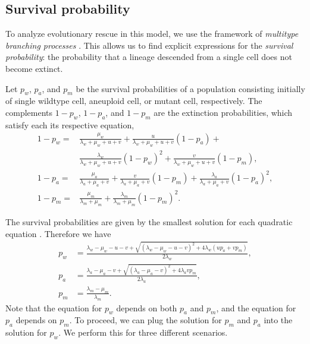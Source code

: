 \documentclass[12pt]{extarticle}
\begin{document}

\subsection*{Survival probability}

To analyze evolutionary rescue in this model, we use the framework of \emph{multitype branching processes} \citep{rybnikov2021fitness,harris1963theory}. 
This allows us to find explicit expressions for the \emph{survival probability}: the probability that a lineage descended from a single cell does not become extinct.

Let $p_w$, $p_a$, and $p_m$ be the survival probabilities of a population consisting initially of single wildtype cell, aneuploid cell, or mutant cell, respectively.
The complements $1-p_w$, $1-p_a$, and $1-p_m$ are the extinction probabilities, which satisfy each its respective equation,
\begin{equation} \label{extinction_prob}
\begin{aligned}
1-p_w = &\frac{\mu_w}{\lambda_w+\mu_w+u+v} + 
		  \frac{u}{\lambda_w+\mu_w+u+v}\left(1-p_a\right) + \\
		  & \frac{\lambda_w}{\lambda_w+\mu_w+u+v}\left(1-p_w\right)^2 +
		  \frac{v}{\lambda_w+\mu_w+u+v}\left(1-p_m\right) ,\\
1-p_a = &\frac{\mu_a}{\lambda_a+\mu_a+v}+\frac{v}{\lambda_a+\mu_a+v}\left(1-p_m\right)+\frac{\lambda_a}{\lambda_a+\mu_a+v}\left(1-p_a\right)^2 ,\\
1-p_m = &\frac{\mu_m}{\lambda_m+\mu_m}+\frac{\lambda_m}{\lambda_m+\mu_m}\left(1-p_m\right)^2 .	 
\end{aligned}
\end{equation}

The survival probabilities are given by the smallest solution for each quadratic equation \citep{uecker2015adaptive}. Therefore we have
\begin{equation}\label{survival_prob}
\begin{aligned}
p_w &= \frac{\lambda_w-\mu_w-u-v+\sqrt{\left(\lambda_w-\mu_w-u-v\right)^2+4\lambda_w\left(up_a+vp_m\right)}}{2\lambda_w} ,\\
p_a &= \frac{\lambda_a-\mu_a-v+\sqrt{\left(\lambda_a-\mu_a-v\right)^2+4\lambda_avp_m}}{2\lambda_a}, \\
p_m &= \frac{\lambda_m-\mu_m}{\lambda_m} .
\end{aligned} 
\end{equation}
Note that the equation for $p_w$ depends on both $p_a$ and $p_m$, and the equation for $p_a$ depends on $p_m$.
To proceed, we can plug the solution for $p_m$ and $p_a$ into the solution for $p_w$. We perform this for three different scenarios.
\end{document}
